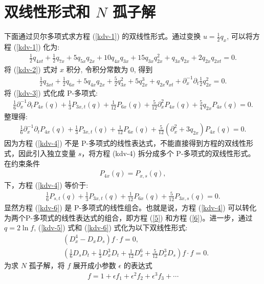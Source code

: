 \section{双线性形式和 $N$ 孤子解}
下面通过贝尔多项式求方程 (\ref{kdv-1}) 的双线性形式。通过变换 $u=\frac{1}{2}q_x$, 可以将方程 (\ref{kdv-1}) 化为:
\begin{align}
\frac{1}{2}q_{4xt}+\frac{1}{2}q_{7x}+5q_{5x}q_{2x}+10q_{4x}q_{3x}+15q_{3x}q_{2x}^2+q_{3x}q_{2x}+2q_{2x}q_{2xt}=0.\label{kdv-2}
\end{align}
将 (\ref{kdv-2}) 式对 $x$ 积分, 令积分常数为 $0$, 得到
\begin{align}
\frac{1}{2}q_{3xt}+\frac{1}{2}q_{6x}+5q_{4x}q_{2x}+\frac{5}{2}q_{3x}^2+5q_{2x}^3+q_{2x}q_{xt}+\partial_x^{-1}\partial_t\frac{1}{2}q_{2x}^2=0.\label{kdv-3}
\end{align}
将 (\ref{kdv-3}) 式化成 P-多项式:
\begin{align}
\frac{1}{6}\partial_x^{-1}\partial_tP_{4x}(q)+\frac{1}{3}P_{3x,t}(q)+\frac{1}{12}P_{6x}(q)+\frac{5}{12}\partial_x^2P_{4x}(q)+\frac{5}{4}q_{2x}P_{4x}(q)=0.
\end{align}
整理得:
\begin{align}
\frac{1}{6}\partial_x^{-1}\partial_tP_{4x}(q)+\frac{1}{3}P_{3x,t}(q)+\frac{1}{12}P_{6x}(q)+\frac{5}{12}(\partial_x^2+3q_{2x})P_{4x}(q)=0.\label{kdv-4}
\end{align}
因为方程 (\ref{kdv-4}) 不是 P-多项式的线性表达式，不能直接得到方程的双线性形式，因此引入独立变量 $s$，将方程 (kdv-4) 拆分成多个 P-多项式的双线性形式。在约束条件
\begin{align}
P_{4x}(q)=P_{x,s}(q),\label{kdv-5}
\end{align}
下，方程 (\ref{kdv-4}) 等价于:
\begin{align}
\frac{1}{6}P_{s,t}(q)+\frac{1}{3}P_{3x,t}(q)+\frac{1}{12}P_{6x}(q)+\frac{5}{12}P_{3x,s}(q)=0.\label{kdv-6}
\end{align}
显然方程 (\ref{kdv-6}) 是 P-多项式的线性组合。也就是说，方程 (\ref{kdv-4}) 可以转化为两个P-多项式的线性表达式的组合，即方程 (\ref{5}) 和方程 (\ref{6})。进一步，通过 $q=2\ln f$, (\ref{kdv-5}) 式和 (\ref{kdv-6}) 式化为以下双线性形式:
\begin{align}
&(D_x^4-D_xD_s)f\cdot f=0,\label{kdv-7}\\
&(\frac{1}{6}D_sD_t+\frac{1}{3}D_x^3D_t+\frac{1}{12}D_x^6+\frac{5}{12}D_x^3D_s)f\cdot f=0.\label{kdv-8}
\end{align}
为求 $N$ 孤子解，将 $f$ 展开成小参数 $\epsilon$ 的表达式
\begin{align}
f=1+\epsilon f_1+\epsilon ^2f_2+\epsilon^3f_3+\cdots \label{kdv-01}
\end{align}
